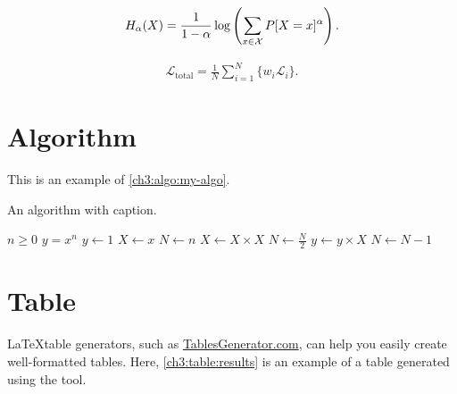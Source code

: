 \begin{equation}
\label{ch3:eq:renyi}
H_{\alpha}(X) =
\frac{1}{1-\alpha}
\log \left(\sum_{x \in {\cal X}}P[X=x]^{\alpha} \right) .
\end{equation}

\begin{equation}
\label{ch3:eq:total-loss}
\begin{aligned}
\mathcal{L}_{\textrm{total}} = \frac{1}{N}\sum_{i=1}^{N}\{w_i\mathcal{L}_i\}.
\end{aligned}
\end{equation}

\section{Algorithm}
\begin{paragraph}
This is an example of \autoref{ch3:algo:my-algo}.
\end{paragraph}

\begin{algorithm}[h]
\caption{An algorithm with caption.}
\label{ch3:algo:my-algo}
\normalsize\singlespacing
\begin{algorithmic}[1] %
    \Require $n \geq 0$
    \Ensure $y = x^n$
    \State $y \gets 1$
    \State $X \gets x$
    \State $N \gets n$
            \State $X \gets X \times X$
            \State $N \gets \frac{N}{2}$ 
            \State $y \gets y \times X$
            \State $N \gets N - 1$
        \EndIf
    \EndWhile
\end{algorithmic}
\end{algorithm}

\section{Table}
\begin{paragraph}
\LaTeX table generators, such as \href{https://www.tablesgenerator.com/}{TablesGenerator.com}\footnotemark{}, can help you easily create well-formatted tables.
Here, \autoref{ch3:table:results} is an example of a table generated using the tool.
\end{paragraph}

